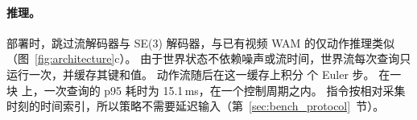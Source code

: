 \paragraph{推理。}
\label{sec:inference}
部署时，\ours 跳过流解码器与 SE(3) 解码器，与已有视频 WAM 的仅动作推理类似 \cite{uva,fastwam}（图~\ref{fig:architecture}c）。
由于世界状态不依赖噪声或流时间，世界流每次查询只运行一次，并缓存其键和值。
动作流随后在这一缓存上积分 \cfgEuler{} 个 Euler 步。
在一块 \cfgGPU{} 上，一次查询的 p95 耗时为 15.1\,ms，在一个控制周期之内。
指令按相对采集时刻的时间索引，所以策略不需要延迟输入（第~\ref{sec:bench_protocol}~节）。
